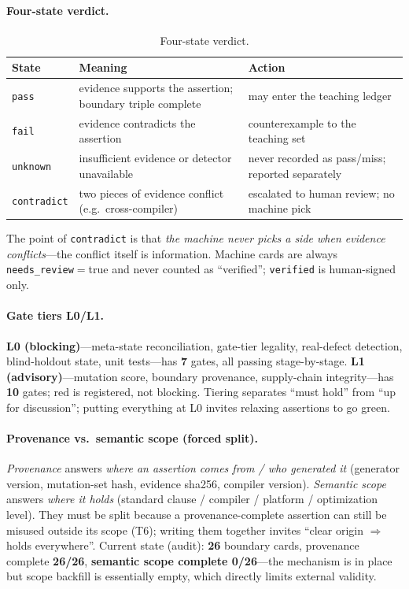 \documentclass{article}
\begin{document}
\paragraph{Four-state verdict.}
\begin{table}[t]
\caption{Four-state verdict.}
\label{tab:verdict}
\centering
\footnotesize
\begin{tabular}{@{}lll@{}}
\toprule
State & Meaning & Action \\
\midrule
\texttt{pass} & evidence supports the assertion; boundary triple complete & may enter the teaching ledger \\
\texttt{fail} & evidence contradicts the assertion & counterexample to the teaching set \\
\texttt{unknown} & insufficient evidence or detector unavailable & never recorded as pass/miss; reported separately \\
\texttt{contradict} & two pieces of evidence conflict (e.g.\ cross-compiler) & escalated to human review; no machine pick \\
\bottomrule
\end{tabular}
\end{table}
The point of \texttt{contradict} is that \emph{the machine never picks a side when evidence
conflicts}---the conflict itself is information. Machine cards are always
\texttt{needs\_review}$=$true and never counted as ``verified''; \texttt{verified} is
human-signed only.

\paragraph{Gate tiers L0/L1.} \textbf{L0 (blocking)}---meta-state reconciliation, gate-tier
legality, real-defect detection, blind-holdout state, unit tests---has \textbf{7} gates, all
passing stage-by-stage. \textbf{L1 (advisory)}---mutation score, boundary provenance,
supply-chain integrity---has \textbf{10} gates; red is registered, not blocking. Tiering
separates ``must hold'' from ``up for discussion''; putting everything at L0 invites relaxing
assertions to go green.

\paragraph{Provenance vs.\ semantic scope (forced split).}
\label{sec:prov}
\emph{Provenance} answers \emph{where an assertion comes from / who generated it} (generator
version, mutation-set hash, evidence sha256, compiler version). \emph{Semantic scope} answers
\emph{where it holds} (standard clause / compiler / platform / optimization level). They must be
split because a provenance-complete assertion can still be misused outside its scope (T6); writing
them together invites ``clear origin $\Rightarrow$ holds everywhere''. Current state (audit):
\textbf{26} boundary cards, provenance complete \textbf{26/26}, \textbf{semantic scope complete
0/26}---the mechanism is in place but scope backfill is essentially empty, which directly limits
external validity.
\end{document}
